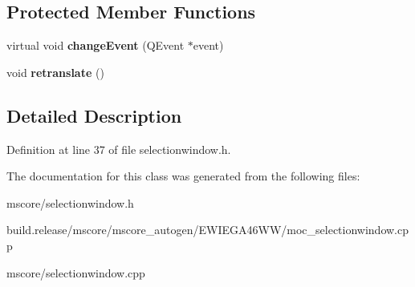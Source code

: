 \subsection*{Protected Member Functions}
\begin{DoxyCompactItemize}
\item 
\mbox{\label{class_ms_1_1_selection_window_a8ba33ecfbad10cd092de97c45f94623f}} 
virtual void {\bfseries change\+Event} (Q\+Event $\ast$event)
\item 
\mbox{\label{class_ms_1_1_selection_window_a4561bc049dd1565ca1239ea6b8f6cf1a}} 
void {\bfseries retranslate} ()
\end{DoxyCompactItemize}


\subsection{Detailed Description}


Definition at line 37 of file selectionwindow.\+h.



The documentation for this class was generated from the following files\+:\begin{DoxyCompactItemize}
\item 
mscore/selectionwindow.\+h\item 
build.\+release/mscore/mscore\+\_\+autogen/\+E\+W\+I\+E\+G\+A46\+W\+W/moc\+\_\+selectionwindow.\+cpp\item 
mscore/selectionwindow.\+cpp\end{DoxyCompactItemize}
